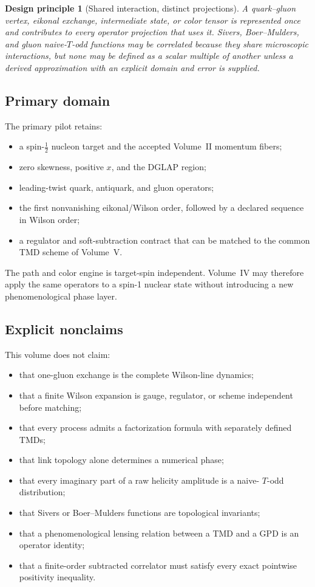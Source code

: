 \documentclass[11pt]{article}
\newtheorem{principle}[definition]{Design principle}
\begin{document}
\begin{principle}[Shared interaction, distinct projections]
\label{prin:shared-rescattering}
A quark--gluon vertex, eikonal exchange, intermediate state, or color tensor
is represented once and contributes to every operator projection that uses
it.  Sivers, Boer--Mulders, and gluon naive-\(T\)-odd functions may be
correlated because they share microscopic interactions, but none may be
defined as a scalar multiple of another unless a derived approximation with
an explicit domain and error is supplied.
\end{principle}

\subsection{Primary domain}

The primary pilot retains:
\begin{itemize}
\item a spin-\(\tfrac12\) nucleon target and the accepted Volume~II momentum
      fibers;
\item zero skewness, positive \(x\), and the DGLAP region;
\item leading-twist quark, antiquark, and gluon operators;
\item the first nonvanishing eikonal/Wilson order, followed by a declared
      sequence in Wilson order;
\item a regulator and soft-subtraction contract that can be matched to the
      common TMD scheme of Volume~V.
\end{itemize}
The path and color engine is target-spin independent.  Volume~IV may therefore
apply the same operators to a spin-1 nuclear state without introducing a new
phenomenological phase layer.

\subsection{Explicit nonclaims}

This volume does not claim:
\begin{itemize}
\item that one-gluon exchange is the complete Wilson-line dynamics;
\item that a finite Wilson expansion is gauge, regulator, or scheme
      independent before matching;
\item that every process admits a factorization formula with separately
      defined TMDs;
\item that link topology alone determines a numerical phase;
\item that every imaginary part of a raw helicity amplitude is a naive-
      \(T\)-odd distribution;
\item that Sivers or Boer--Mulders functions are topological invariants;
\item that a phenomenological lensing relation between a TMD and a GPD is an
      operator identity;
\item that a finite-order subtracted correlator must satisfy every exact
      pointwise positivity inequality.
\end{itemize}
\end{document}
